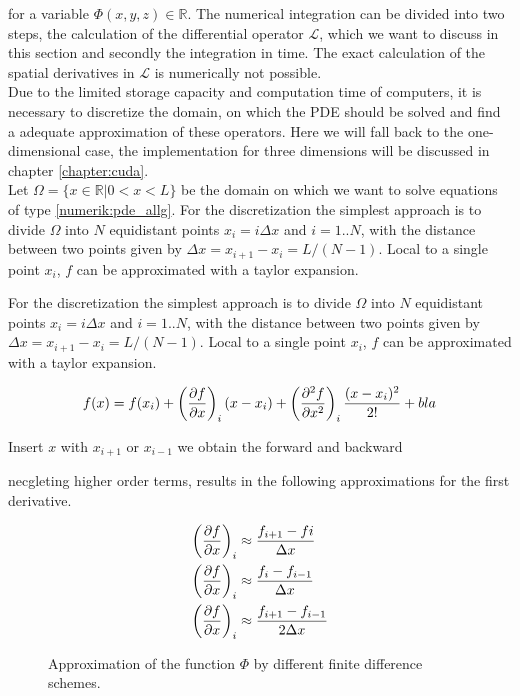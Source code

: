 for a variable $\Phi(x, y, z)\in\mathbb{R}$.
The numerical integration can be divided into two steps, the calculation of the differential operator $\mathcal{L}$, which we want to discuss in this
section and secondly the integration in time.
The exact calculation of the spatial derivatives in $\mathcal{L}$ is numerically not possible.\\
Due to the limited storage capacity and computation time of computers,
it is necessary to discretize the domain, on which the PDE should be solved and find a adequate approximation of these operators.
Here we will fall back to the  one-dimensional case, the implementation for three dimensions will be discussed in chapter \ref{chapter:cuda}.\\
Let $\Omega = \{x \in \mathbb{R} | 0 < x < L\}$ be the domain on which we want to solve equations of type \ref{numerik:pde_allg}.
For the discretization the simplest approach is to divide $\Omega$ into $N$ equidistant points $x_i= i\Delta x$ and $i=1..N$,
with the distance between two points given by $\Delta x = x_{i+1} - x_i = L/(N-1)$.
Local to a single point $x_i$, $f$ can be approximated with a taylor expansion.

For the discretization the simplest approach is to divide $\Omega$ into $N$ equidistant points $x_i= i\Delta x$ and $i=1..N$,
with the distance between two points given by $\Delta x = x_{i+1} - x_i = L/(N-1)$.
Local to a single point $x_i$, $f$ can be approximated with a taylor expansion.

\begin{align}
    f(x) = f(x_i) + \left(\pdn[f]{x} \right)_i (x - x_i) + \left(\pdn[^2f]{x^2}\right)_i \frac{(x-x_i)^2}{2!} + bla
\end{align}

Insert $x$ with $x_{i+1}$ or $x_{i-1}$ we obtain the forward and backward

 necgleting higher order terms, results in the following approximations for the first derivative.

\begin{align}
    \left(\pdn[f]{x}\right)_i &\approx \frac{f_{i+1} - f{i}}{\Delta x}\\
    \left(\pdn[f]{x}\right)_i &\approx \frac{f_{i} - f_{i-1}}{\Delta x}\\
    \left(\pdn[f]{x}\right)_i &\approx \frac{f_{i+1} - f_{i-1}}{2\Delta x}
\end{align}

\begin{figure}[!tpb]
  \centering

  \caption{Approximation of the function $\Phi$ by different finite difference schemes.}
\end{figure}

